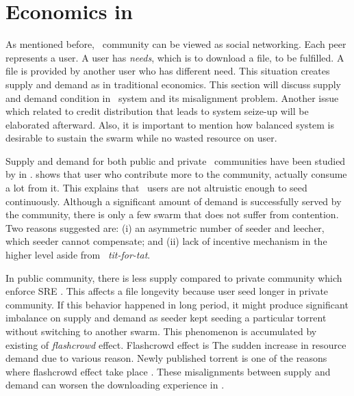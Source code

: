 \section{Economics in \bt}
As mentioned before, \bt~community can be viewed as social networking. Each peer represents a user. A user has \textit{needs}, which is to download a file, to be fulfilled. A file is provided by another user who has different need. This situation creates supply and demand as in traditional economics. This section will discuss supply and demand condition in \bt~system and its misalignment problem. Another issue which related to credit distribution that leads to system seize-up will be elaborated afterward. Also, it is important to mention how balanced system is desirable to sustain the swarm while no wasted resource on user.

Supply and demand for both public and private \bt~communities have been studied by \citeauthor{2009:demandsupplyres:andrade} in \citeyear{2009:demandsupplyres:andrade}. \citeauthor{2009:demandsupplyres:andrade} shows that user who contribute more to the community, actually consume a lot from it. This explains that \bt~users are not altruistic enough to seed continuously. Although a significant amount of demand is successfully served by the community, there is only a few swarm that does not suffer from contention. Two reasons \citeauthor{2009:demandsupplyres:andrade} suggested are: (i) an asymmetric number of seeder and leecher, which seeder cannot compensate; and (ii) lack of incentive mechanism in the higher level aside from \bt~\textit{tit-for-tat}. 

In public community, there is less supply compared to private community which enforce SRE \cite{2009:demandsupplyres:andrade}. This affects a file longevity because user seed longer in private community. If this behavior happened in long period, it might produce significant imbalance on supply and demand as seeder kept seeding a particular torrent without switching to another swarm. This phenomenon is accumulated by existing of \textit{flashcrowd} effect. Flashcrowd effect is The sudden increase in resource demand due to various reason. Newly published torrent is one of the reasons where flashcrowd effect take place \cite{2013:swarmevolution:su}. These misalignments between supply and demand can worsen the downloading experience in \bt.

